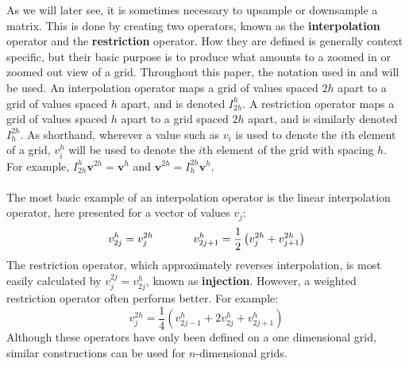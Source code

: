 As we will later see, it is sometimes necessary to upsample or downsample a matrix. This is done by creating two operators, known as the \textbf{interpolation} operator and the \textbf{restriction} operator. How they are defined is generally context specific, but their basic purpose is to produce what amounts to a zoomed in or zoomed out view of a grid. Throughout this paper, the notation used in \cite{lee14} and \cite{briggs87} will be used. An interpolation operator maps a grid of values spaced $2h$ apart to a grid of values spaced $h$ apart, and is denoted $I_{2h}^h$. A restriction operator maps a grid of values spaced $h$ apart to a grid spaced $2h$ apart, and is similarly denoted $I_h^{2h}$. As shorthand, wherever a value such as $v_i$ is used to denote the $i$th element of a grid, $v_i^h$ will be used to denote the $i$th element of the grid with spacing $h$. For example, $I_{2h}^h\textbf{v}^{2h}=\textbf{v}^h$ and $\textbf{v}^{2h}=I_{h}^{2h}\textbf{v}^h$.
\\\\
The most basic example of an interpolation operator is the linear interpolation operator, here presented for a vector of values $v_j$:
\[v_{2j}^h=v_j^{2h}\hspace{.5in}
v_{2j+1}^h=\frac{1}{2}\left(v_j^{2h}+v_{j+1}^{2h}\right)\]
The restriction operator, which approximately reverses interpolation, is most easily calculated by $v_j^{2j}=v_{2j}^h$, known as \textbf{injection}. However, a weighted restriction operator often performs better. For example:
\[v_j^{2h}=\frac{1}{4}\left(
	v_{2j-1}^h+2v_{2j}^h+v_{2j+1}^h\right)\]
Although these operators have only been defined on a one dimensional grid, similar constructions can be used for $n$-dimensional grids.
